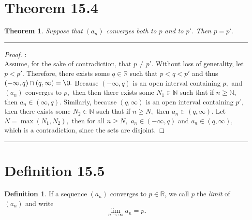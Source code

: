 \documentclass[openany, amssymb, psamsfonts]{amsart}
\newcommand{\bbN}{\mathbb{N}}
\newcommand{\bbR}{\mathbb{R}}
\renewcommand{\emptyset}{\O}
\newtheorem{thm}{Theorem}[section]
\theoremstyle{definition}
\newtheorem{defn}{Definition}[section]
\numberwithin{equation}{section}
\begin{document}
\section*{Theorem 15.4}
\begin{thm}
\label{15.4}
	Suppose that $(a_n)$ converges both to $p$ and to $p'$.
	Then $p = p'$.
\end{thm}
\vspace{4pt}     \hrule   \vspace{4pt} \begin{proof}:\\
Assume, for the sake of contradiction, that $p \neq p'.$ Without loss of generality, let $p<p'.$ Therefore, there exists some $q \in \bbR$ such that $p< q < p'$ and thus $(-\infty,q) \cap (q, \infty) = \emptyset.$ Because $(-\infty,q)$ is an open interval containing $p,$ and $(a_n)$ converges to $p,$ then then there exists some $N_1\in \bbN$ such that if $n\geq \bbN$, then $a_{n} \in (\infty,q).$ Similarly, because $(q,\infty)$ is an open interval containing $p',$ then there exists some $N_2\in \bbN$ such that if $n\geq N,$ then $a_{n}\in (q,\infty).$ Let $N = \max(N_1, N_2),$ then for all $n\geq N,$ $a_n \in (-\infty, q)$ and $a_n \in (q, \infty),$ which is a contradiction, since the sets are disjoint. 
\end{proof} \vspace{4pt}     \hrule   \vspace{4pt} 

\section*{Definition 15.5}
\begin{defn}
\label{15.5}
	If a sequence $(a_n)$ converges to $p \in \bbR$, we call $p$ the \emph{limit} of $(a_n)$ and write
	\[
		\lim_{n \to \infty} a_n = p.
	\]
\end{defn}
\end{document}
